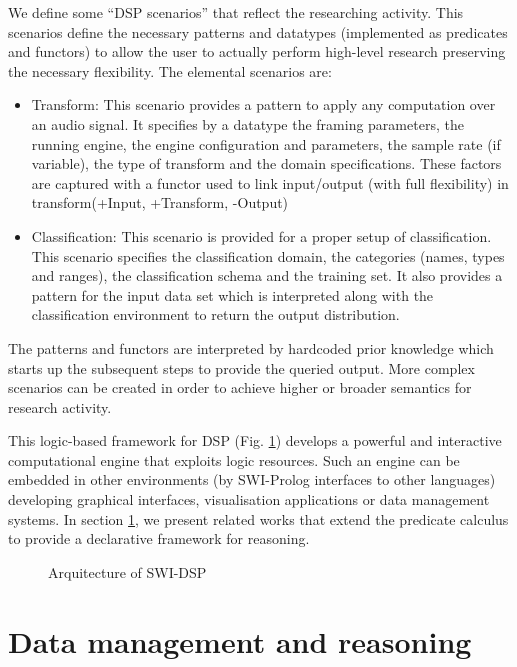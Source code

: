 \documentclass[runningheads]{llncs}
\begin{document}
We define some ``DSP scenarios'' that reflect the researching activity. This scenarios define the necessary patterns and datatypes (implemented as predicates and functors) to allow the user to actually perform high-level research preserving the necessary flexibility. The elemental scenarios are:

\begin{itemize}
 \item Transform: This scenario provides a pattern to apply any computation over an audio signal. It specifies by a datatype the framing parameters, the running engine, the engine configuration and parameters, the sample rate (if variable), the type of transform and the domain specifications. These factors are captured with a functor used to link input/output (with full flexibility) in transform(+Input, +Transform, -Output)
 \item Classification: This scenario is provided for a proper setup of classification. This scenario specifies the classification domain, the categories (names, types and ranges), the classification schema and the training set. It also provides a pattern for the input data set which is interpreted along with the classification environment to return the output distribution.
\end{itemize}

The patterns and functors are interpreted by hardcoded prior knowledge which starts up the subsequent steps to provide the queried output. More complex scenarios can be created in order to achieve higher or broader semantics for research activity.

This logic-based framework for DSP (Fig. \ref{fig:dspdrawing}) develops a powerful and interactive computational engine that exploits logic resources. Such an engine can be embedded in other environments (by SWI-Prolog interfaces to other languages) developing graphical interfaces, visualisation applications or data management systems. In section \ref{sec:datamanage}, we present related works that extend the predicate calculus to provide a declarative framework for reasoning.

\begin{figure}
\centerline{}
\caption{Arquitecture of SWI-DSP}
\label{fig:dspdrawing}
\end{figure}

\section{Data management and reasoning}\label{sec:datamanage}
\end{document}
